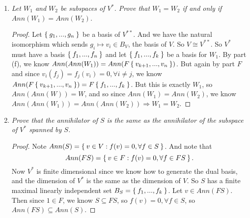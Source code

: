 \documentclass[10pt,oneside,reqno]{amsart}
\theoremstyle{plain}
\theoremstyle{definition}
\theoremstyle{remark}
\newcommand{\sub}{\subseteq}
\newcommand{\bb}{\vspace{3mm}}
\begin{document}
\begin{enumerate}[label=\arabic*.]
\begin{enumerate}
\begin{proof}
Now we apply the result of part (c). We want to show $Ann(W_1 \cap W_2) \sub Ann(W_1) + Ann(W_2)$. By this result we know this is equivalent to showing:
$$
Ann(Ann(W_1 \cap W_2)) = W_1 \cap W_2 \sub Ann(Ann(W_1) + Ann(W_2)).
$$
So let $B_V$ be a basis for $V$, and let $B_{V^*}$ be a basis for $V^*$. Then let $\Set{f_1,...,k}$ be a basis for $W_1$ and define $\Set{f_l,...,f_m}$ as basis for $W_2$, without loss of generality, where $m,k \leq n = \dim V = \dim V^*$. Then by part (f) we know $Ann(W_1) = F(B_V \setminus \Set{f_1,...,f_k})$ and $Ann(W_2) = F(B_V \setminus \Set{f_l,...,f_m})$. So $Ann(W_1) + Ann(W_2) = A =  F(B_V \setminus (\Set{f_l,...,f_m}\cap \Set{f_1,...,f_k}))$. And by part (f) again we know $Ann(A) = F(B_{V^*} \setminus (B_{V^*} \setminus F(\Set{f_l,...,f_m}\cap \Set{f_1,...,f_k}))) = W_1 \cap W_2$. So we have proved the other inclusion, and we are done.  
\end{proof}
\bb
\item \textit{Let $W_1$ and $W_2$ be subspaces of $V^*$. Prove that $W_1 = W_2$ if and only if $Ann(W_1) = Ann(W_2)$. }
\bb

\begin{proof}
Let $\Set{g_1,...,g_n}$ be a basis of $V^{**}$. And we have the natural isomorphism which sends $g_i \mapsto v_i \in B_V$, the basis of $V$. So $V \cong V^{**}$. So $V^*$ must have a basis $\Set{f_1,...,f_n}$ and let $\Set{f_1,...,f_k}$ be a basis for $W_1$. By part (f), we know $Ann(Ann(W_1)) = Ann(F\Set{v_{k + 1},...,v_n})$.  But again by part $F$ and since $v_i(f_j) = f_j(v_i) = 0,\forall i\neq j$, we know $ Ann(F\Set{v_{k + 1},...,v_n}) = F\Set{f_1,...,f_k}$. But this is exactly $W_1$, so $Ann(Ann(W)) = W$, and so since $Ann(W_1) = Ann(W_2)$, we know $Ann(Ann(W_1)) = Ann(Ann(W_2)) \Rightarrow W_1 = W_2$. 
\end{proof}

\bb

\item \textit{Prove that the annihilator of $S$ is the same as the annihilator of the subspace of $V^*$ spanned by $S$. }

\bb

\begin{proof}
Note $Ann(S) = \Set{v \in V: f(v) = 0, \forall f \in S}$. And note that 
$$
Ann(FS) = \Set{v \in F:f(v) = 0,\forall f \in FS}.
$$
 Now $V^*$ is finite dimensional since we know how to generate the dual basis, and the dimension of $V^*$ is the same as the dimension of $V$. So $S$ has a finite maximal linearly independent set $B_S = \Set{f_1,...,f_k}$. Let $v \in Ann(FS)$. Then since $1 \in F$, we know $S \sub FS$, so $f(v) = 0,\forall f \in S$, so $Ann(FS) \sub Ann(S)$. 
 

\end{proof}
\end{enumerate}
\end{enumerate}
\end{document}
